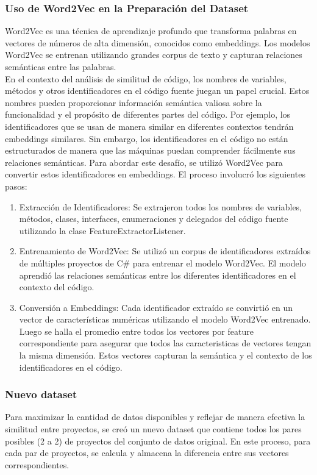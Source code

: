 \subsubsection{Uso de Word2Vec en la Preparación del Dataset}
Word2Vec es una técnica de aprendizaje profundo que transforma palabras en vectores de números de alta dimensión, conocidos como embeddings. Los modelos Word2Vec se entrenan utilizando grandes corpus de texto y capturan relaciones semánticas entre las palabras.  \\

En el contexto del análisis de similitud de código, los nombres de variables, métodos y otros identificadores en el código fuente juegan un papel crucial. Estos nombres pueden proporcionar información semántica valiosa sobre la funcionalidad y el propósito de diferentes partes del código. Por ejemplo, los identificadores que se usan de manera similar en diferentes contextos tendrán embeddings similares. Sin embargo, los identificadores en el código no están estructurados de manera que las máquinas puedan comprender fácilmente sus relaciones semánticas. Para abordar este desafío, se utilizó Word2Vec para convertir estos identificadores en embeddings. El proceso involucró los siguientes pasos:

\begin{enumerate}
	\item Extracción de Identificadores: Se extrajeron todos los nombres de variables, métodos, clases, interfaces, enumeraciones y delegados del código fuente utilizando la clase FeatureExtractorListener.
	
	\item Entrenamiento de Word2Vec: Se utilizó un corpus de identificadores extraídos de múltiples proyectos de C\# para entrenar el modelo Word2Vec. El modelo aprendió las relaciones semánticas entre los diferentes identificadores en el contexto del código.
	
	\item Conversión a Embeddings: Cada identificador extraído se convirtió en un vector de características numéricas utilizando el modelo Word2Vec entrenado. Luego se halla el promedio entre todos los vectores por feature correspondiente para asegurar que todos las caracteristicas de vectores tengan la misma dimensión. Estos vectores capturan la semántica y el contexto de los identificadores en el código.
	 
\end{enumerate}

\subsubsection{Nuevo dataset}
Para maximizar la cantidad de datos disponibles y reflejar de manera efectiva la similitud entre proyectos, se creó un nuevo dataset que contiene todos los pares posibles (2 a 2) de proyectos del conjunto de datos original. En este proceso, para cada par de proyectos, se calcula y almacena la diferencia entre sus vectores correspondientes.

